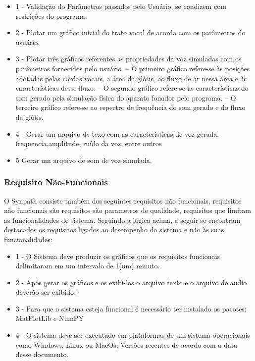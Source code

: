 		\begin{itemize}
			\item 1 - Validação do Parâmetros passados pelo Usuário, se condizem com restrições do programa.
			\item 2 - Plotar um gráﬁco inicial do trato vocal de acordo com os parâmetros do usuário.
			\item 3 - Plotar três gráﬁcos referentes as propriedades da voz simuladas com os parâmetros fornecidos pelo usuário. – O primeiro gráﬁco refere-se às posições adotadas pelas cordas vocais, a área da glótis, ao ﬂuxo de ar nessa área e às características desse ﬂuxo. – O segundo gráﬁco refere-se às características do som gerado pela simulação física do aparato fonador pelo programa. – O terceiro gráﬁco refere-se ao espectro de frequência do som gerado e do ﬂuxo da glótis.
			\item 4 - Gerar um arquivo de texo com as características de voz gerada, frequencia,amplitude, ruído da voz, entre outros
			\item 5 Gerar um arquivo de som de voz simulada.
		\end{itemize}
		
		\subsubsection{Requisito Não-Funcionais}
		
		O Synpath consiste também dos seguintes requisitos não funcionais, requisitos não funcionais são requisitos são parametros de qualidade, requisitos que limitam as funcionalidades do sistema\cite{SWEBOK}. Seguindo a lógica acima, a seguir se encontram destacados os requisitos ligados ao desempenho do sistema e não às suas funcionalidades: 
		
		\begin{itemize}
			\item 1 - O Sistema deve produzir os gráficos que os requisitos funcionais delimitaram em um intervalo de 1(um) minuto. 
			\item 2  - Após gerar os gráficos e os exibi-los o arquivo texto e o arquivo de audio deverão ser exibidos
			\item 3 - Para que o sistema esteja funcional é necessário ter instalado os pacotes: MatPlotLib e NumPY
			\item 4 - O sistema deve ser executado em plataformas de um sistema operacionais como Windows, Linux ou MacOs, Versões recentes de acordo com a data desse documento. 
			
		\end{itemize}
		
